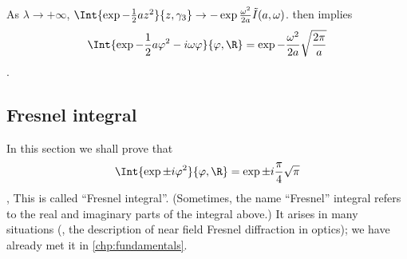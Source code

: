 As $\lambda\rightarrow+\infty$, 
   \begin{math}
   \Int{\exp{-\frac{1}{2} a z^{2}}}{z,\gamma_{3}} \rightarrow 
   - \exp{\frac{\omega^{2}}{2a}} \tilde{I}(a,\omega)
\end{math}.
 then implies
\begin{dmath*}
   \Int{\exp{-\frac{1}{2}a\varphi^{2} - i\omega \varphi }
	 }{\varphi, \R}  = 
   \exp{-\frac{\omega^{2}}{2a}}
   \sqrt{\frac{2\pi}{a}} 
\end{dmath*}.

\subsection{Fresnel integral}
\label{sec:Fresnel case}


In this section we shall prove that
\begin{dmath}[label={fresnel}]
   \Int{ \exp{\pm i\varphi^{2}}}{\varphi,\R} = \exp{\pm i\frac{\pi}{4}} \sqrt{\pi}
\end{dmath}, 
This is called ``Fresnel integral''.
(Sometimes, the name ``Fresnel'' integral refers to the real and imaginary
parts of the integral above.)
It arises in many situations (\eg, the description of near field Fresnel
diffraction in optics); we have already met it in
\cref{chp:fundamentals}.

